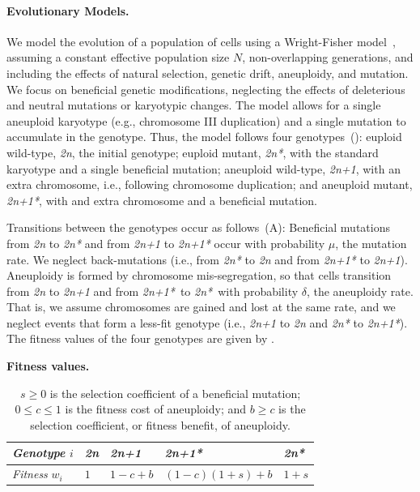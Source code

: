 \documentclass[12pt]{extarticle}
\newcommand{\euwt}{\emph{2n}}
\newcommand{\anwt}{\emph{2n+1}}
\newcommand{\eumt}{\emph{2n*}}
\newcommand{\anmt}{\emph{2n+1*}}
\begin{document}
\paragraph*{Evolutionary Models.}
We model the evolution of a population of cells using a Wright-Fisher model~\citep{Otto2007}, assuming a constant effective population size $N$, non-overlapping generations, and including the effects of natural selection, genetic drift, aneuploidy, and mutation. 
We focus on beneficial genetic modifications, neglecting the effects of deleterious and neutral mutations or karyotypic changes.
The model allows for a single aneuploid karyotype (e.g., chromosome III duplication) and a single mutation to accumulate in the genotype.
Thus, the model follows four genotypes~(): euploid wild-type, \euwt, the initial genotype; 
euploid mutant, \eumt, with the standard karyotype and a single beneficial mutation; 
aneuploid wild-type, \anwt, with an extra chromosome, i.e., following chromosome duplication; and
aneuploid mutant, \anmt, with and extra chromosome and a beneficial mutation. 

Transitions between the genotypes occur as follows~(A): Beneficial mutations from \euwt\; to \eumt\; and from \anwt\; to \anmt\; occur with probability $\mu$, the mutation rate. We neglect back-mutations (i.e., from \eumt\; to \euwt\; and from \anmt\; to \anwt).
Aneuploidy is formed by chromosome mis-segregation, so that cells transition from \euwt\; to \anwt\; and from \anmt\ to \eumt\ with probability $\delta$, the aneuploidy rate. That is, we assume chromosomes are gained and lost at the same rate, and we neglect events that form a less-fit genotype (i.e., \anwt\; to \euwt\; and \eumt\; to \anmt).
The fitness values of the four genotypes are given by .

\begin{table}[h]
\centering
\caption{\textbf{Fitness values.}}
\begin{tabular}{lllll}
\emph{Genotype} $i$ & \euwt & \anwt & \anmt & \eumt \\
\hline
\emph{Fitness} $w_i$ & $1$ & $1-c+b$ & $(1-c)(1+s)+b$ & $1+s$               
\end{tabular}
\label{table:fitness}
\caption*{
$s \ge 0$ is the selection coefficient of a beneficial mutation;
$0 \le c \le 1$ is the fitness cost of aneuploidy;
and $b \ge c$ is the selection coefficient, or fitness benefit, of aneuploidy.
}
\end{table}
\end{document}
